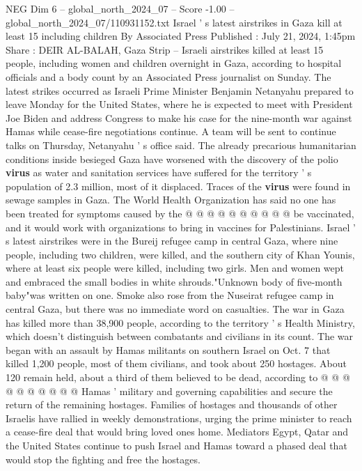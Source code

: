 \begin{textsample}{NEG Dim 6 – global\_north\_2024\_07 – Score -1.00 – global\_north\_2024\_07/110931152.txt}  \label{ex:f6_neg_139}
Israel ' s latest airstrikes in Gaza kill at least 15 including children By Associated Press Published : July 21, 2024, 1:45pm Share : DEIR AL-BALAH, Gaza Strip -- Israeli airstrikes killed at least 15 people, including women and children overnight in Gaza, according to hospital officials and a body count by an Associated Press journalist on Sunday.
The latest strikes occurred as Israeli Prime Minister Benjamin Netanyahu prepared to leave Monday for the United States, where he is expected to meet with President Joe Biden and address Congress to make his case for the nine-month war against Hamas while cease-fire negotiations continue.
A team will be sent to continue talks on Thursday, Netanyahu ' s office said.
The already precarious humanitarian conditions inside besieged Gaza have worsened with the discovery of the polio \textbf{virus} as water and sanitation services have suffered for the territory ' s population of 2.3 million, most of it displaced.
Traces of the \textbf{virus} were found in sewage samples in Gaza.
The World Health Organization has said no one has been treated for symptoms caused by the @ @ @ @ @ @ @ @ @ @ be vaccinated, and it would work with organizations to bring in vaccines for Palestinians.
Israel ' s latest airstrikes were in the Bureij refugee camp in central Gaza, where nine people, including two children, were killed, and the southern city of Khan Younis, where at least six people were killed, including two girls.
Men and women wept and embraced the small bodies in white shrouds."Unknown body of five-month baby"was written on one.
Smoke also rose from the Nuseirat refugee camp in central Gaza, but there was no immediate word on casualties.
The war in Gaza has killed more than 38,900 people, according to the territory ' s Health Ministry, which doesn't distinguish between combatants and civilians in its count.
The war began with an assault by Hamas militants on southern Israel on Oct. 7 that killed 1,200 people, most of them civilians, and took about 250 hostages.
About 120 remain held, about a third of them believed to be dead, according to @ @ @ @ @ @ @ @ @ @ Hamas ' military and governing capabilities and secure the return of the remaining hostages.
Families of hostages and thousands of other Israelis have rallied in weekly demonstrations, urging the prime minister to reach a cease-fire deal that would bring loved ones home.
Mediators Egypt, Qatar and the United States continue to push Israel and Hamas toward a phased deal that would stop the fighting and free the hostages.

\end{textsample}
